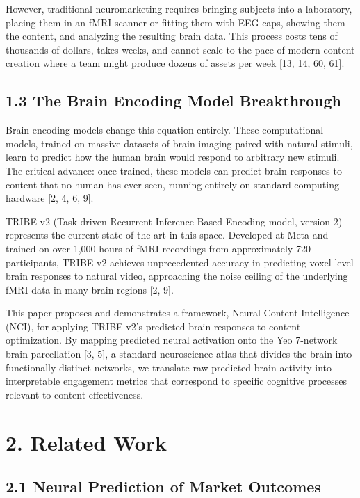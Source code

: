 \documentclass[11pt,letterpaper]{article}
\begin{document}
However, traditional neuromarketing requires bringing subjects into a laboratory, placing them in an fMRI scanner or fitting them with EEG caps, showing them the content, and analyzing the resulting brain data. This process costs tens of thousands of dollars, takes weeks, and cannot scale to the pace of modern content creation where a team might produce dozens of assets per week [13, 14, 60, 61].

\subsection{1.3 The Brain Encoding Model Breakthrough}

Brain encoding models change this equation entirely. These computational models, trained on massive datasets of brain imaging paired with natural stimuli, learn to predict how the human brain would respond to arbitrary new stimuli. The critical advance: once trained, these models can predict brain responses to content that no human has ever seen, running entirely on standard computing hardware [2, 4, 6, 9].

TRIBE v2 (Task-driven Recurrent Inference-Based Encoding model, version 2) represents the current state of the art in this space. Developed at Meta and trained on over 1,000 hours of fMRI recordings from approximately 720 participants, TRIBE v2 achieves unprecedented accuracy in predicting voxel-level brain responses to natural video, approaching the noise ceiling of the underlying fMRI data in many brain regions [2, 9].

This paper proposes and demonstrates a framework, Neural Content Intelligence (NCI), for applying TRIBE v2's predicted brain responses to content optimization. By mapping predicted neural activation onto the Yeo 7-network brain parcellation [3, 5], a standard neuroscience atlas that divides the brain into functionally distinct networks, we translate raw predicted brain activity into interpretable engagement metrics that correspond to specific cognitive processes relevant to content effectiveness.


\section{2. Related Work}

\subsection{2.1 Neural Prediction of Market Outcomes}
\end{document}
